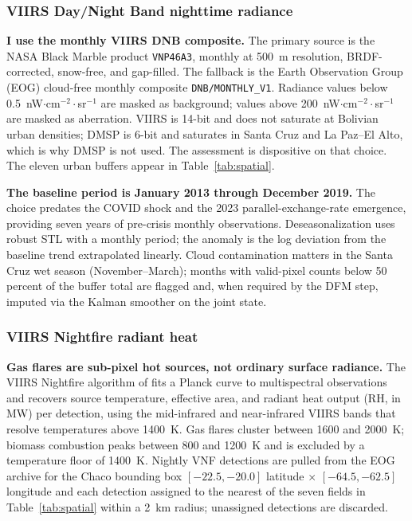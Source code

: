 \documentclass[11pt,letterpaper]{article}
\newcommand{\claim}[1]{\textbf{#1.}}
\begin{document}
\subsubsection{VIIRS Day/Night Band nighttime radiance}

\claim{I use the monthly VIIRS DNB composite} The primary source is the NASA Black Marble product \texttt{VNP46A3}, monthly at \num{500}~m resolution, BRDF-corrected, snow-free, and gap-filled. The fallback is the Earth Observation Group (EOG) cloud-free monthly composite \texttt{DNB/MONTHLY\_V1}. Radiance values below \num{0.5}~nW$\cdot$cm$^{-2}\cdot$sr$^{-1}$ are masked as background; values above \num{200}~nW$\cdot$cm$^{-2}\cdot$sr$^{-1}$ are masked as aberration. VIIRS is 14-bit and does not saturate at Bolivian urban densities; DMSP is 6-bit and saturates in Santa Cruz and La Paz--El Alto, which is why DMSP is not used. The \citet{gibson_etal2021} assessment is dispositive on that choice. The eleven urban buffers appear in Table~\ref{tab:spatial}.

\claim{The baseline period is January \num{2013} through December \num{2019}} The choice predates the COVID shock and the \num{2023} parallel-exchange-rate emergence, providing seven years of pre-crisis monthly observations. Deseasonalization uses robust STL with a monthly period; the anomaly is the log deviation from the baseline trend extrapolated linearly. Cloud contamination matters in the Santa Cruz wet season (November--March); months with valid-pixel counts below \num{50} percent of the buffer total are flagged and, when required by the DFM step, imputed via the Kalman smoother on the joint state.

\subsubsection{VIIRS Nightfire radiant heat}

\claim{Gas flares are sub-pixel hot sources, not ordinary surface radiance} The VIIRS Nightfire algorithm of \citet{elvidge_vnf2013} fits a Planck curve to multispectral observations and recovers source temperature, effective area, and radiant heat output (RH, in MW) per detection, using the mid-infrared and near-infrared VIIRS bands that resolve temperatures above \num{1400}~K. Gas flares cluster between \num{1600} and \num{2000}~K; biomass combustion peaks between \num{800} and \num{1200}~K and is excluded by a temperature floor of \num{1400}~K. Nightly VNF detections are pulled from the EOG archive for the Chaco bounding box $[-22.5, -20.0]$ latitude $\times$ $[-64.5, -62.5]$ longitude and each detection assigned to the nearest of the seven fields in Table~\ref{tab:spatial} within a \num{2}~km radius; unassigned detections are discarded.
\end{document}
